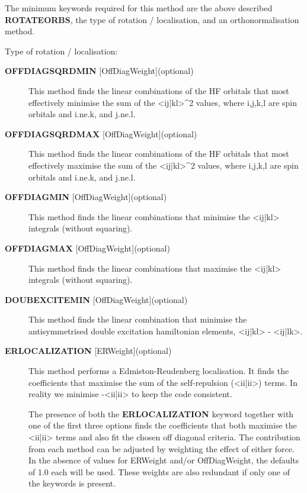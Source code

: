 \documentclass[openany,a4paper,10pt]{manual}
\begin{document}
The minimum keywords required for this method are the above described \textbf{ROTATEORBS},
the type of rotation / localisation, and an orthonormalisation method.

Type of rotation / localisation:
\begin{description}
\item[\textbf{OFFDIAGSQRDMIN} {[}OffDiagWeight{]}(optional)]
This method finds the linear combinations of the HF orbitals that most effectively
minimise the sum of the \textless{}ij|kl\textgreater{}\textasciicircum{}2 values, where i,j,k,l are spin orbitals and
i.ne.k, and j.ne.l.

\item[\textbf{OFFDIAGSQRDMAX} {[}OffDiagWeight{]}(optional)]
This method finds the linear combinations of the HF orbitals that most effectively
maximise the sum of the \textless{}ij|kl\textgreater{}\textasciicircum{}2 values, where i,j,k,l are spin orbitals and
i.ne.k, and j.ne.l.

\item[\textbf{OFFDIAGMIN} {[}OffDiagWeight{]}(optional)]
This method finds the linear combinations that minimise the \textless{}ij|kl\textgreater{} integrals (without
squaring).

\item[\textbf{OFFDIAGMAX} {[}OffDiagWeight{]}(optional)]
This method finds the linear combinations that maximise the \textless{}ij|kl\textgreater{} integrals (without
squaring).

\item[\textbf{DOUBEXCITEMIN} {[}OffDiagWeight{]}(optional)]
This method finds the linear combination that minimise the antisymmetrised double excitation
hamiltonian elements, \textless{}ij|kl\textgreater{} - \textless{}ij|lk\textgreater{}.

\item[\textbf{ERLOCALIZATION} {[}ERWeight{]}(optional)]
This method performs a Edmiston-Reudenberg localisation.  It finds the coefficients
that maximise the sum of the self-repulsion (\textless{}ii|ii\textgreater{}) terms.
In reality we minimise -\textless{}ii|ii\textgreater{} to keep the code consistent.

The presence of both the \textbf{ERLOCALIZATION} keyword together with one of the first three
options finds the coefficients that both maximise the \textless{}ii|ii\textgreater{} terms and also fit the chosen
off diagonal criteria.
The contribution from each method can be adjusted by weighting the effect of either force.
In the absence of values for ERWeight and/or OffDiagWeight, the defaults of 1.0 each
will be used.
These weights are also redundant if only one of the keywords is present.


\end{description}
\end{document}
